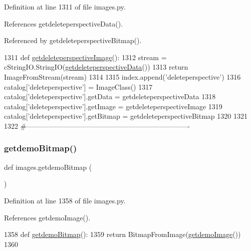 Definition at line 1311 of file images.\+py.



References getdeleteperspective\+Data().



Referenced by getdeleteperspective\+Bitmap().


\begin{DoxyCode}
1311 \textcolor{keyword}{def }\hyperlink{namespaceimages_a6f233689e4bb013dc7be2b86300ce54e}{getdeleteperspectiveImage}():
1312     stream = cStringIO.StringIO(\hyperlink{namespaceimages_adf4a80b7f1fe515d188f8edc76ad9f8c}{getdeleteperspectiveData}())
1313     \textcolor{keywordflow}{return} ImageFromStream(stream)
1314 
1315 index.append(\textcolor{stringliteral}{'deleteperspective'})
1316 catalog[\textcolor{stringliteral}{'deleteperspective'}] = ImageClass()
1317 catalog[\textcolor{stringliteral}{'deleteperspective'}].getData = getdeleteperspectiveData
1318 catalog[\textcolor{stringliteral}{'deleteperspective'}].getImage = getdeleteperspectiveImage
1319 catalog[\textcolor{stringliteral}{'deleteperspective'}].getBitmap = getdeleteperspectiveBitmap
1320 
1321 
1322 \textcolor{comment}{#----------------------------------------------------------------------}
\end{DoxyCode}
\mbox{\label{namespaceimages_aceba80a531ffd0e0ce56747f172bf6b2}} 
\subsubsection{\texorpdfstring{getdemo\+Bitmap()}{getdemoBitmap()}}
{\footnotesize\ttfamily def images.\+getdemo\+Bitmap (\begin{DoxyParamCaption}{ }\end{DoxyParamCaption})}



Definition at line 1358 of file images.\+py.



References getdemo\+Image().


\begin{DoxyCode}
1358 \textcolor{keyword}{def }\hyperlink{namespaceimages_aceba80a531ffd0e0ce56747f172bf6b2}{getdemoBitmap}():
1359     \textcolor{keywordflow}{return} BitmapFromImage(\hyperlink{namespaceimages_a28056879b7958528bee6430c85d879e2}{getdemoImage}())
1360 
\end{DoxyCode}
\mbox{\label{namespaceimages_aefe2e85aaaee18eb0ec08f7a35451037}} 
